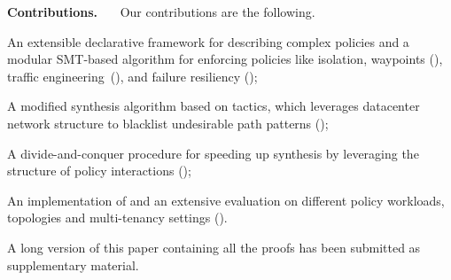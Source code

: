 \noindent \textbf{Contributions.} \ \ \ Our contributions are the following.
\begin{compactitemize}
\item An extensible declarative framework for describing
  complex policies and a modular SMT-based algorithm for enforcing policies 
  like isolation, waypoints (), traffic engineering~(), and 
  failure resiliency ();
\item A modified synthesis algorithm based on tactics, which leverages datacenter network structure
  to blacklist undesirable path patterns ();
\item A divide-and-conquer procedure for speeding up synthesis by leveraging the 
structure of policy interactions ();
\item An implementation of \Name and an extensive evaluation on
  different policy workloads, topologies and multi-tenancy
  settings ().
\end{compactitemize}

\iffull\else
A long version
of this paper containing all the proofs has been submitted as supplementary material.
\fi
